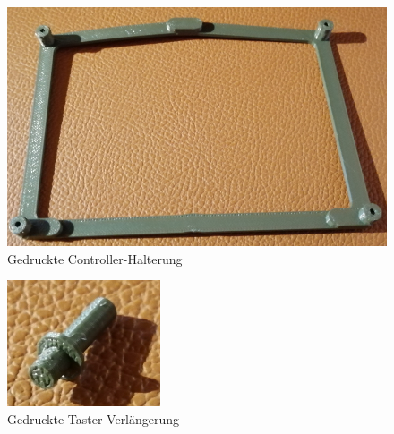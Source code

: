\begin{minipage}[b]{0.54\textwidth}
\centering
\vspace{-6mm}
\begin{figure}[H] %
\includegraphics[width=.85\textwidth]{sec2/images/3DAnbaukomponenten/Druckbilder/ControllerHalterungDruck} 
\centering
\captionsetup{width=.95\textwidth}
\caption[Gedruckte Controller-Halterung]{Gedruckte Controller-Halterung}\centering
\label{fig:ControllerHalterungDruck}
\end{figure}
\end{minipage}
\begin{minipage}[b]{0.36\textwidth}
\vspace{-6mm}
\begin{figure}[H] %
\includegraphics[width=.8\textwidth]{sec2/images/3DAnbaukomponenten/Druckbilder/DruckTasterDruck} 
\centering
\captionsetup{width=.95\textwidth}
\caption[Gedruckte Taster-Verlängerung]{Gedruckte Taster-Verlängerung}
\centering
\label{fig:DruckTasterDruck}
\end{figure}
\end{minipage}


